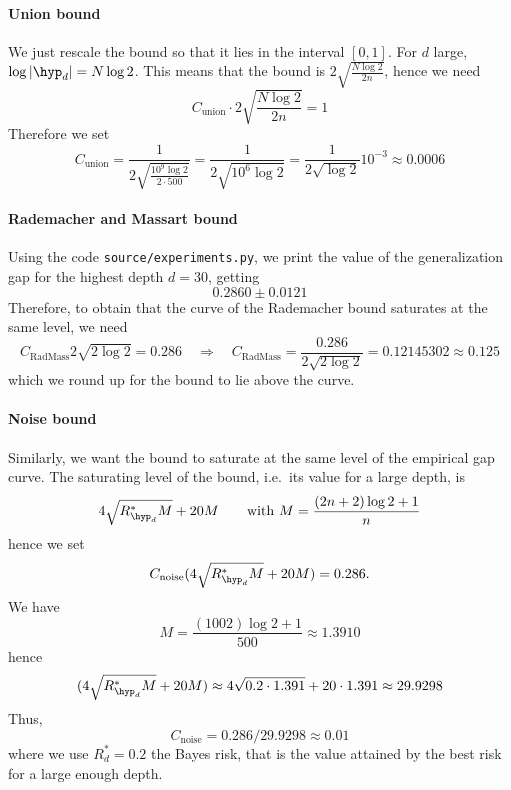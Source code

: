 \paragraph{Union bound} We just rescale the bound so that it lies in the interval $[0,1]$. For $d$ large, $\log\vert\hyp_d\vert = N\log 2$. This means that the bound is $2 \sqrt{\frac{N\log 2}{2n}}$, hence we need
\[
C_\text{union}\cdot 2 \sqrt{\frac{N\log 2}{2n}} = 1
\]
Therefore we set
\[ C_\text{union} = \frac{1}{2 \sqrt{\frac{10^9\log 2}{2\cdot 500}}} = \frac{1}{2 \sqrt{ 10^6\log 2 }} = \frac{1}{2\sqrt{\log 2}}10^{-3} \approx 0.0006
\]


\paragraph{Rademacher and Massart bound} Using the code \texttt{source/experiments.py}, we print the value of the generalization gap for the highest depth $d=30$, getting 
\[
0.2860 \pm 0.0121
\]
Therefore, to obtain that the curve of the Rademacher bound saturates at the same level, we need
\[
C_{\text{RadMass}}2\sqrt{2\log 2} = 0.286 \quad \Rightarrow \quad C_{\text{RadMass}} = \frac{0.286}{2\sqrt{2\log 2}} = 0.12145302 \approx 0.125
\]
which we round up for the bound to lie above the curve. 


\paragraph{Noise bound} Similarly, we want the bound to saturate at the same level of the empirical gap curve. The saturating level of the bound, i.e.\ its value for a large depth, is 
\[
4\sqrt{R^*_{\hyp_d}M} + 20M \qquad \text{with }M = \frac{(2n+2)\log 2+1}{n}
\]
hence we set
\[
C_{\text{noise}} (4\sqrt{R^*_{\hyp_d}M} + 20M) = 0.286.
\]
We have 
\[
M = \frac{(1002)\log 2+1}{500} \approx 1.3910
\]
hence 
\[
(4\sqrt{R^*_{\hyp_d}M} + 20M) \approx 4 \sqrt{0.2\cdot 1.391} + 20\cdot 1.391 \approx 29.9298
\]
Thus,
\[
C_{\text{noise}} = 0.286 / 29.9298 \approx 0.01
\]
where we use $R^*_d = 0.2$ the Bayes risk, that is the value attained by the best risk for a large enough depth. 

